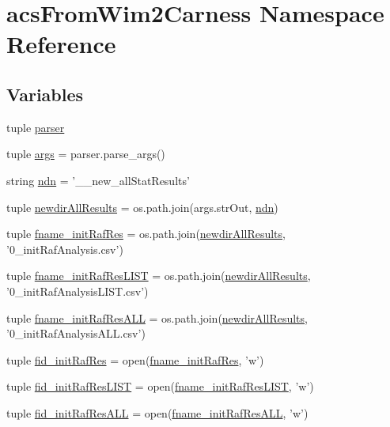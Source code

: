 \hypertarget{a00100}{\section{acs\-From\-Wim2\-Carness Namespace Reference}
\label{a00100}
}
\subsection*{Variables}
\begin{DoxyCompactItemize}
\item 
tuple \hyperlink{a00100_aed93287ef2c9a4a9ba68f8ffc75aae17}{parser}
\item 
tuple \hyperlink{a00100_ac4c461267ee7f11bbe525de64f56cd10}{args} = parser.\-parse\-\_\-args()
\item 
string \hyperlink{a00100_a6f995419ddd7f2de58506d9541238dbc}{ndn} = '\-\_\-\_\-new\-\_\-all\-Stat\-Results'
\item 
tuple \hyperlink{a00100_a4af2fb5abbd4a6e8930401e66af5b79d}{newdir\-All\-Results} = os.\-path.\-join(args.\-str\-Out, \hyperlink{a00100_a6f995419ddd7f2de58506d9541238dbc}{ndn})
\item 
tuple \hyperlink{a00100_a6df9226d812c675c76a936c215c07e53}{fname\-\_\-init\-Raf\-Res} = os.\-path.\-join(\hyperlink{a00100_a4af2fb5abbd4a6e8930401e66af5b79d}{newdir\-All\-Results}, '0\-\_\-init\-Raf\-Analysis.\-csv')
\item 
tuple \hyperlink{a00100_a69f06c42408f8a1ae74e34daa83402b7}{fname\-\_\-init\-Raf\-Res\-L\-I\-S\-T} = os.\-path.\-join(\hyperlink{a00100_a4af2fb5abbd4a6e8930401e66af5b79d}{newdir\-All\-Results}, '0\-\_\-init\-Raf\-Analysis\-L\-I\-S\-T.\-csv')
\item 
tuple \hyperlink{a00100_a89c98e628d7938077b4ed18215d4fd9b}{fname\-\_\-init\-Raf\-Res\-A\-L\-L} = os.\-path.\-join(\hyperlink{a00100_a4af2fb5abbd4a6e8930401e66af5b79d}{newdir\-All\-Results}, '0\-\_\-init\-Raf\-Analysis\-A\-L\-L.\-csv')
\item 
tuple \hyperlink{a00100_a2f9cfe05abfed3ab6326d0cb094c7c80}{fid\-\_\-init\-Raf\-Res} = open(\hyperlink{a00100_a6df9226d812c675c76a936c215c07e53}{fname\-\_\-init\-Raf\-Res}, 'w')
\item 
tuple \hyperlink{a00100_a7af2668de12720f3c7925527002d81b0}{fid\-\_\-init\-Raf\-Res\-L\-I\-S\-T} = open(\hyperlink{a00100_a69f06c42408f8a1ae74e34daa83402b7}{fname\-\_\-init\-Raf\-Res\-L\-I\-S\-T}, 'w')
\item 
tuple \hyperlink{a00100_add1c3bb75f1d98889c27099fc14fc6a8}{fid\-\_\-init\-Raf\-Res\-A\-L\-L} = open(\hyperlink{a00100_a89c98e628d7938077b4ed18215d4fd9b}{fname\-\_\-init\-Raf\-Res\-A\-L\-L}, 'w')

\end{DoxyCompactItemize}
